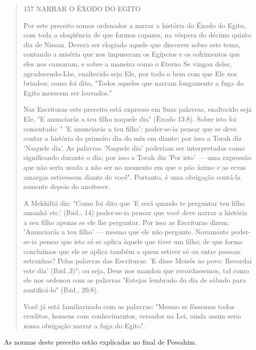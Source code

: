 \begin{quote}
157 NARRAR O ÊXODO DO EGITO

Por este preceito somos ordenados a narrar a história do Êxodo do Egito,
com toda a eloqüência de que formos capazes, na véspera do décimo quinto
dia de Nissan. Deverá ser elogiado aquele que discorrer sobre este tema,
contan­do a miséria que nos impuseram os Egípcios e os sofrimentos que
eles nos cau­saram, e sobre a maneira como o Eterno Se vingou deles,
agradecendo-Lhe, enal­tecido seja Ele, por todo o bem com que Ele nos
brindou; como foi dito, "To­dos aqueles que narram longamente a fuga do
Egito merecem ser louvados."

Nas Escrituras este preceito está expresso em Suas palavras, enalteci­do
seja Ele, "E anunciarás a teu filho naquele dia" (Êxodo 13:8). Sobre
isto foi comentado: " 'E anunciarás a teu filho': poder-se-ia pensar que
se deve contar a história do primeiro dia do mês em diante; por isso a
Torah diz 'Naquele dia'. As palavras 'Naquele dia' poderiam ser
interpretadas como significando duran­te o dia; por isso a Torah diz
'Por isto' --- uma expressão que não seria usada a não ser no momento em
que o pão ázimo e as ervas amargas estivessem dian­te de você".
Portanto, é uma obrigação contá-la somente depois do anoitecer.

A Mekhiltá diz: "Como foi dito que 'E será quando te perguntar teu filho
amanhã etc.' (Ibid., 14) poder-se-ia pensar que você deve narrar a
história a seu filho apenas se ele lhe perguntar. Por isso as Escrituras
dizem: 'Anunciarás a teu filho' --- mesmo que ele não pergunte.
Novamente poder-se-ia pensar que isto só se aplica àquele que tiver um
filho; de que forma concluímos que ele se aplica também a quem estiver
só ou entre pessoas estranhas? Pelas palavras das Escrituras: 'E disse
Moisés ao povo: Recordai este dia' (Ibid.,3)"; ou seja, Deus nos mandou
que recordassemos, tal como ele nos ordenou com as pala­vras "Estejas
lembrado do dia de sábado para santificá-lo" (Ibid., 20:8).

Você já está familiarizado com as palavras: "Mesmo se fôssemos to­dos
eruditos, homens com conhecimentos, versados na Lei, ainda assim seria
nossa obrigação narrar a fuga do Egito".
\end{quote}

As normas deste preceito estão explicadas no final de Pessahim.

